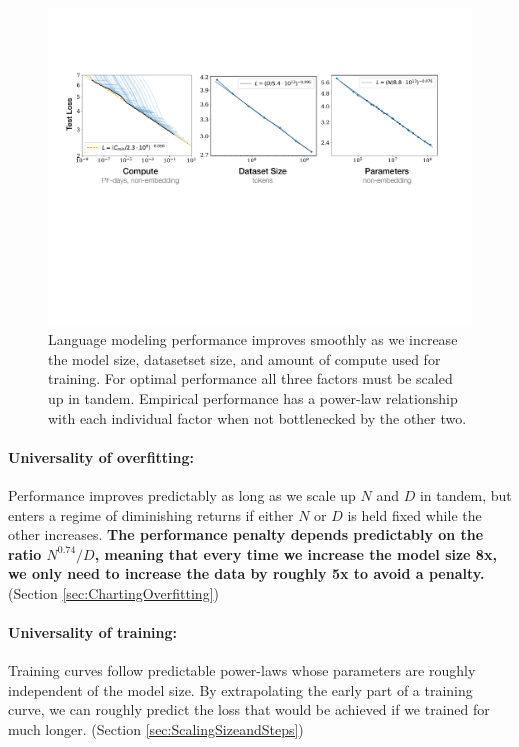 \documentclass[english]{article}
\begin{document}
\begin{figure}
\includegraphics[width=\textwidth]{SimplePowerLaws}

\caption[Summary of simple power laws.]{Language modeling performance improves smoothly as we increase the model size, datasetset size, and amount of compute used for training.  For optimal performance all three factors must be scaled up in tandem. Empirical performance has a power-law relationship with each individual factor when not bottlenecked by the other two.  \label{fig:BasicPowerLaws}}
\end{figure}

\paragraph{Universality of overfitting:} Performance improves predictably as long as we scale up $N$ and $D$ in tandem, but enters a regime of diminishing returns if either $N$ or $D$ is held fixed while the other increases.  \textbf{The performance penalty depends predictably on the ratio $N^{0.74}/D$, meaning that every time we increase the model size 8x, we only need to increase the data by roughly 5x to avoid a penalty.} (Section \ref{sec:ChartingOverfitting})

\paragraph{Universality of training:} Training curves follow predictable power-laws whose parameters are roughly independent of the model size.  By extrapolating the early part of a training curve, we can roughly predict the loss that would be achieved if we trained for much longer. (Section \ref{sec:ScalingSizeandSteps})
\end{document}

